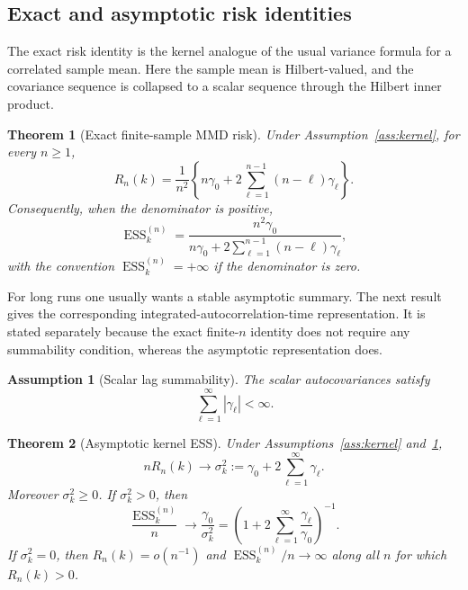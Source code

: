 \documentclass[11pt]{article}
\newtheorem{theorem}{Theorem}
\newtheorem{assumption}{Assumption}
\newcommand{\1}{\mathbf{1}}
\newcommand{\ESS}{\operatorname{ESS}}
\begin{document}
\subsection{Exact and asymptotic risk identities}

The exact risk identity is the kernel analogue of the usual variance formula for a correlated sample mean. Here the sample mean is Hilbert-valued, and the covariance sequence is collapsed to a scalar sequence through the Hilbert inner product.

\begin{theorem}[Exact finite-sample MMD risk]
\label{thm:exact-risk}
Under Assumption~\ref{ass:kernel}, for every $n\ge1$,
\begin{equation}
\label{eq:exact-risk}
R_n(k)=
\frac{1}{n^2}\left\{n\gamma_0+2\sum_{\ell=1}^{n-1}(n-\ell)\gamma_\ell\right\}.
\end{equation}
Consequently, when the denominator is positive,
\begin{equation}
\label{eq:exact-ess-formula}
\ESS_k^{(n)}=
\frac{n^2\gamma_0}{n\gamma_0+2\sum_{\ell=1}^{n-1}(n-\ell)\gamma_\ell},
\end{equation}
with the convention $\ESS_k^{(n)}=+\infty$ if the denominator is zero.
\end{theorem}

For long runs one usually wants a stable asymptotic summary. The next result gives the corresponding integrated-autocorrelation-time representation. It is stated separately because the exact finite-$n$ identity does not require any summability condition, whereas the asymptotic representation does.

\begin{assumption}[Scalar lag summability]
\label{ass:scalar-summability}
The scalar autocovariances satisfy
\[
\sum_{\ell=1}^\infty |\gamma_\ell|<\infty.
\]
\end{assumption}

\begin{theorem}[Asymptotic kernel ESS]
\label{thm:asymp-risk}
Under Assumptions~\ref{ass:kernel} and~\ref{ass:scalar-summability},
\begin{equation}
\label{eq:sigma-k}
nR_n(k)\to \sigma_k^2:=\gamma_0+2\sum_{\ell=1}^\infty\gamma_\ell.
\end{equation}
Moreover $\sigma_k^2\ge0$. If $\sigma_k^2>0$, then
\begin{equation}
\label{eq:asymp-ess}
\frac{\ESS_k^{(n)}}{n}\to \frac{\gamma_0}{\sigma_k^2}
=
\left(1+2\sum_{\ell=1}^\infty\frac{\gamma_\ell}{\gamma_0}\right)^{-1}.
\end{equation}
If $\sigma_k^2=0$, then $R_n(k)=o(n^{-1})$ and $\ESS_k^{(n)}/n\to\infty$ along all $n$ for which $R_n(k)>0$.
\end{theorem}
\end{document}
